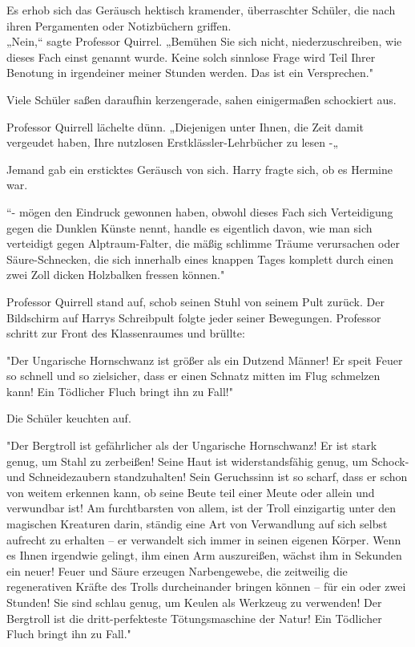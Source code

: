 {Es erhob sich das Geräusch hektisch kramender, überraschter Schüler, die nach ihren Pergamenten oder Notizbüchern griffen.\\ „Nein,“ sagte Professor Quirrel. „Bemühen Sie sich nicht, niederzuschreiben, wie dieses Fach einst genannt wurde. Keine solch sinnlose Frage wird Teil Ihrer Benotung in irgendeiner meiner Stunden werden. Das ist ein Versprechen."

Viele Schüler saßen daraufhin kerzengerade, sahen einigermaßen schockiert aus.

Professor Quirrell lächelte dünn. „Diejenigen unter Ihnen, die Zeit damit vergeudet haben, Ihre nutzlosen Erstklässler-Lehrbücher zu lesen -„

Jemand gab ein ersticktes Geräusch von sich. Harry fragte sich, ob es Hermine war.

“- mögen den Eindruck gewonnen haben, obwohl dieses Fach sich Verteidigung gegen die Dunklen Künste nennt, handle es eigentlich davon, wie man sich verteidigt gegen Alptraum-Falter, die mäßig schlimme Träume verursachen oder Säure-Schnecken, die sich innerhalb eines knappen Tages komplett durch einen zwei Zoll dicken Holzbalken fressen können."

Professor Quirrell stand auf, schob seinen Stuhl von seinem Pult zurück. Der Bildschirm auf Harrys Schreibpult folgte jeder seiner Bewegungen. Professor schritt zur Front des Klassenraumes und brüllte:

"Der Ungarische Hornschwanz ist größer als ein Dutzend Männer! Er speit Feuer so schnell und so zielsicher, dass er einen Schnatz mitten im Flug schmelzen kann! Ein Tödlicher Fluch bringt ihn zu Fall!"

Die Schüler keuchten auf.

"Der Bergtroll ist gefährlicher als der Ungarische Hornschwanz! Er ist stark genug, um Stahl zu zerbeißen! Seine Haut ist widerstandsfähig genug, um Schock- und Schneidezaubern standzuhalten! Sein Geruchssinn ist so scharf, dass er schon von weitem erkennen kann, ob seine Beute teil einer Meute oder allein und verwundbar ist! Am furchtbarsten von allem, ist der Troll einzigartig unter den magischen Kreaturen darin, ständig eine Art von Verwandlung auf sich selbst aufrecht zu erhalten -- er verwandelt sich immer in seinen eigenen Körper. Wenn es Ihnen irgendwie gelingt, ihm einen Arm auszureißen, wächst ihm in Sekunden ein neuer! Feuer und Säure erzeugen Narbengewebe, die zeitweilig die regenerativen Kräfte des Trolls durcheinander bringen können -- für ein oder zwei Stunden! Sie sind schlau genug, um Keulen als Werkzeug zu verwenden! Der Bergtroll ist die dritt-perfekteste Tötungsmaschine der Natur! Ein Tödlicher Fluch bringt ihn zu Fall."

}
